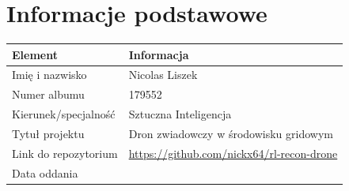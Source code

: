 \section{Informacje podstawowe}
\label{sec:informacje}

\begin{center}
\begin{tabular}{p{}p{}}
\toprule
Element & Informacja \\
\midrule
Imię i nazwisko & Nicolas Liszek \\
Numer albumu & 179552 \\
Kierunek/specjalność & Sztuczna Inteligencja \\
Tytuł projektu & Dron zwiadowczy w środowisku gridowym \\
Link do repozytorium & \url{https://github.com/nickx64/rl-recon-drone} \\
Data oddania & \\
\bottomrule
\end{tabular}
\end{center}
